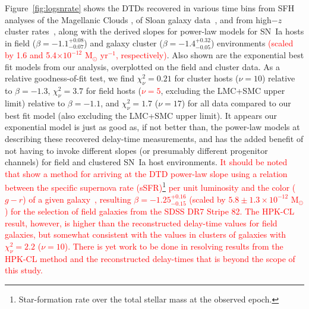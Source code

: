 \documentclass[apj, linenumbers]{aastex62}
\begin{document}
Figure~\ref{fig:logsnrate} shows the DTDs recovered in various time bins from SFH analyses of the Magellanic Clouds \citep{Maoz:2010}, of Sloan galaxy data~\citep{Maoz:2010a, Maoz:2011, Maoz:2012a,Graur:2013}, and from high$-z$ cluster rates~\citep{Friedmann:2018hq}, along with the derived  slopes for power-law models for SN~Ia hosts in field ($\beta=-1.1^{+0.08}_{-0.07}$) and galaxy cluster ($\beta=-1.4^{+0.32}_{-0.05}$) environments \textcolor{red}{(scaled by 1.6 and 5.4$\times10^{-12}$ M$_{\odot}$ yr$^{-1}$, respectively)}. Also shown are the exponential best fit models from our analysis, overplotted on the field and cluster data. As a relative goodness-of-fit test, we find  $\chi^2_{\nu}=0.21$ for cluster hosts ($\nu=10$) relative to $\beta=-1.3$, $\chi^2_{\nu}=3.7$ for field hosts (\textcolor{red}{$\nu=5$}, excluding the LMC+SMC upper limit) relative to $\beta=-1.1$, and $\chi^2_{\nu}=1.7$ ($\nu=17$) for all data compared to our best fit model (also excluding the LMC+SMC upper limit). It appears our exponential model is just as good as, if not better than, the power-law models at describing these recovered delay-time measurements, and has the added benefit of not having to invoke different slopes (or presumably different progenitor channels) for field and clustered SN~Ia host environments. \textcolor{red}{It should be noted that \cite[HPK-CL]{Heringer:2019ws} show a method for arriving at the DTD power-law slope using a relation between the specific supernova rate (sSFR)\footnote{Star-formation rate over the total stellar mass at the observed epoch.}  per unit luminosity and the color ($g-r$) of a given galaxy~\citep{Heringer:2017fp}, resulting  $\beta=-1.25^{+0.16}_{-0.15}$ (scaled by $5.8\pm1.3\times10^{-12}$ M$_{\odot}$) for the selection of field galaxies from the SDSS DR7 Stripe 82. The HPK-CL result, however, is higher than the reconstructed delay-time values for field galaxies, but somewhat consistent with the values in clusters of galaxies with $\chi^2_{\nu}=2.2$ ($\nu=10$). There is yet work to be done in resolving results from the HPK-CL method and the reconstructed delay-times that is beyond the scope of this study.}
\end{document}
